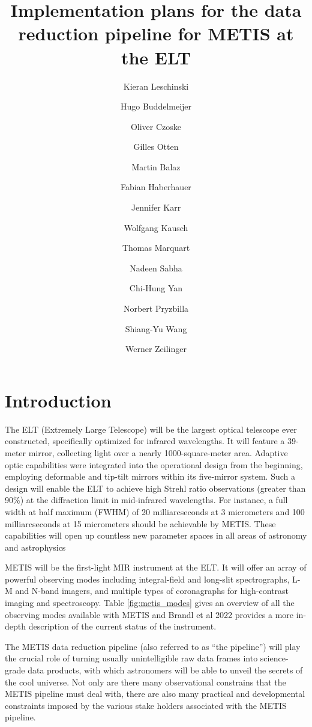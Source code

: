 \documentclass[a4paper]{spie}  %
\title{Implementation plans for the data reduction pipeline for METIS at the ELT}
\author[a]{Kieran Leschinski}
\author[a]{Hugo Buddelmeijer}
\author[a]{Oliver Czoske}
\author[b]{Gilles Otten}
\author[a]{Martin Balaz}
\author[a]{Fabian Haberhauer}
\author[b]{Jennifer Karr}
\author[c]{Wolfgang Kausch}
\author[d]{Thomas Marquart}
\author[c]{Nadeen Sabha}
\author[b]{Chi-Hung Yan}
\author[c]{Norbert Pryzbilla}
\author[b]{Shiang-Yu Wang}
\author[a]{Werner Zeilinger}
\affil[a]{University of Vienna, T\"urkenschanztra\ss e 18, 1180 Vienna, Austria}
\affil[b]{ASIAA, Taiwan}
\affil[c]{University of Innsbruck, Austria}
\affil[d]{University of Uppsala, Sweden}
\begin{document}
 
\maketitle

\begin{abstract}


\end{abstract}



\section{Introduction}
The ELT (Extremely Large Telescope) will be the largest optical telescope ever constructed, specifically optimized for infrared wavelengths. 
It will feature a 39-meter mirror, collecting light over a nearly 1000-square-meter area. 
Adaptive optic capabilities were integrated into the operational design from the beginning, employing deformable and tip-tilt mirrors within its five-mirror system. 
Such a design will enable the ELT to achieve high Strehl ratio observations (greater than 90\%) at the diffraction limit in mid-infrared wavelengths. 
For instance, a full width at half maximum (FWHM) of 20 milliarcseconds at 3 micrometers and 100 milliarcseconds at 15 micrometers should be achievable by METIS. 
These capabilities will open up countless new parameter spaces in all areas of astronomy and astrophysics


METIS will be the first-light MIR instrument at the ELT.
It will offer  an array of powerful observing modes including  integral-field and long-slit spectrographs, L-M and N-band imagers, and multiple types of coronagraphs for high-contrast imaging and spectroscopy.
Table \ref{fig:metis_modes} gives an overview of all the observing modes available with METIS and Brandl et al 2022 \cite{metis_spie_2022} provides a more in-depth description of the current status of the instrument. 

The METIS data reduction pipeline (also referred to as  ``the pipeline'') will play the crucial role of turning usually unintelligible raw data frames into science-grade data products, with which astronomers will be able to unveil the secrets of the cool universe.
Not only are there many observational constrains that the METIS pipeline must deal with, there are also many practical and developmental constraints imposed by the various stake holders associated with the METIS pipeline.
\end{document}
